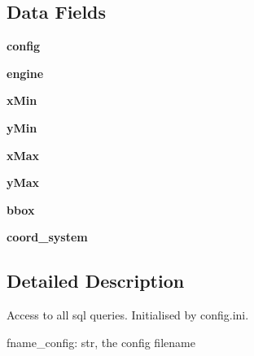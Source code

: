 \subsection*{Data Fields}
\begin{DoxyCompactItemize}
\item 
\mbox{\label{class_data___i_o_1_1_data___i_o_ad2256458892609d0533df5d72a7257ad}} 
{\bfseries config}
\item 
\mbox{\label{class_data___i_o_1_1_data___i_o_a4720cf3b5a198cd8121ea0e55bdb2954}} 
{\bfseries engine}
\item 
\mbox{\label{class_data___i_o_1_1_data___i_o_a14458fd88d7e32efa9171dc573b16ee0}} 
{\bfseries x\+Min}
\item 
\mbox{\label{class_data___i_o_1_1_data___i_o_a74ba6471a3e71621ecb57c4eb1b0cfcd}} 
{\bfseries y\+Min}
\item 
\mbox{\label{class_data___i_o_1_1_data___i_o_acc3139dfa8a349ddea139df2fa843434}} 
{\bfseries x\+Max}
\item 
\mbox{\label{class_data___i_o_1_1_data___i_o_a038056d25e751ffb5b3a061a0a27ac99}} 
{\bfseries y\+Max}
\item 
\mbox{\label{class_data___i_o_1_1_data___i_o_ac0f879659935d910e7650d8e8c3de9a1}} 
{\bfseries bbox}
\item 
\mbox{\label{class_data___i_o_1_1_data___i_o_a7bad551ee75c172ad731f6da4c5e80ae}} 
{\bfseries coord\+\_\+system}
\end{DoxyCompactItemize}


\subsection{Detailed Description}
\begin{DoxyVerb}Access to all sql queries. Initialised by config.ini.

fname_config: str, the config filename
\end{DoxyVerb}
 

